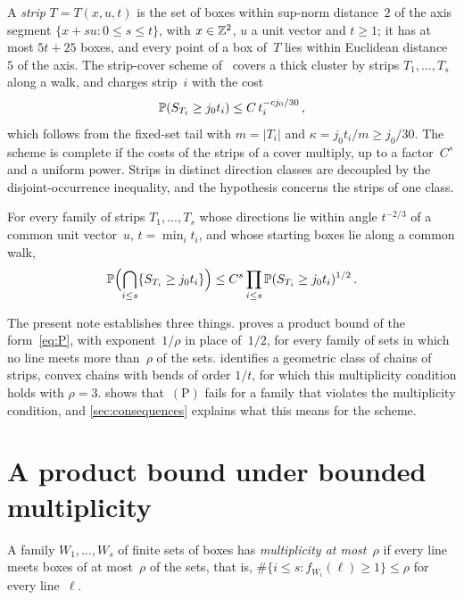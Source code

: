 \documentclass[11pt,letterpaper]{article}
\begin{document}
A \emph{strip} $T=T(x,u,t)$ is the set of boxes within sup-norm distance~$2$ of the axis segment $\{x+su\colon0\le s\le t\}$, with $x\in\Z^2$, $u$ a unit vector and $t\ge1$; it has at most $5t+25$ boxes, and every point of a box of~$T$ lies within Euclidean distance~$5$ of the axis. The strip-cover scheme of~\cite[Section~3]{SC26} covers a thick cluster by strips $T_1,\dots,T_s$ along a walk, and charges strip~$i$ with the cost
\begin{equation}
\label{eq:stripcost}
  \P(S_{T_i}\ge j_0t_i)\le C\,t_i^{-cj_0/30}\,,
\end{equation}
which follows from the fixed-set tail with $m=\lvert T_i\rvert$ and $\kappa=j_0t_i/m\ge j_0/30$. The scheme is complete if the costs of the strips of a cover multiply, up to a factor~$C^s$ and a uniform power. Strips in distinct direction classes are decoupled by the disjoint-occurrence inequality, and the hypothesis concerns the strips of one class.

\begin{definition}
\label{def:P}
For every family of strips $T_1,\dots,T_s$ whose directions lie within angle $t^{-2/3}$ of a common unit vector~$u$, $t=\min_it_i$, and whose starting boxes lie along a common walk,
\begin{equation}
\label{eq:P}
  \P\Bigl(\bigcap_{i\le s}\{S_{T_i}\ge j_0t_i\}\Bigr)\le C^s\prod_{i\le s}\P(S_{T_i}\ge j_0t_i)^{1/2}\,.
\end{equation}
\end{definition}

The present note establishes three things.  proves a product bound of the form~\eqref{eq:P}, with exponent~$1/\rho$ in place of~$1/2$, for every family of sets in which no line meets more than~$\rho$ of the sets.  identifies a geometric class of chains of strips, convex chains with bends of order $1/t$, for which this multiplicity condition holds with $\rho=3$.  shows that~$\mathrm{(P)}$ fails for a family that violates the multiplicity condition, and \cref{sec:consequences} explains what this means for the scheme.

\section{A product bound under bounded multiplicity}
\label{sec:product}

\begin{definition}[Multiplicity]
\label{def:mult}
A family $W_1,\dots,W_s$ of finite sets of boxes has \emph{multiplicity at most~$\rho$} if every line meets boxes of at most~$\rho$ of the sets, that is, $\#\{i\le s\colon f_{W_i}(\ell)\ge1\}\le\rho$ for every line~$\ell$.
\end{definition}
\end{document}
